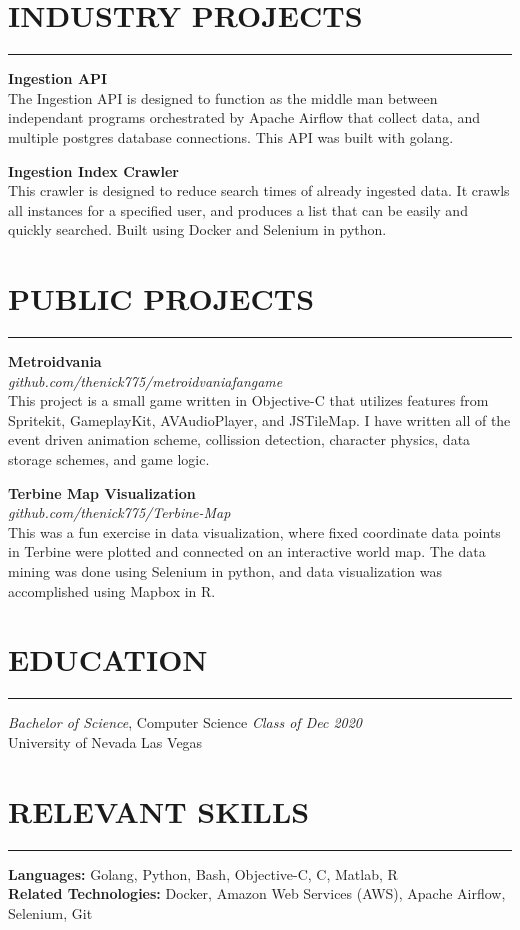 \documentclass{res}
\begin{document}
\begin{resume}
		\section{{INDUSTRY PROJECTS}}
    \noindent\rule[0.5ex]{\linewidth}{1pt}
		{\bf Ingestion API} \hfill \vspace{3pt} \\
			The Ingestion API is designed to function as the middle man between independant programs orchestrated by Apache Airflow that collect data, and multiple postgres database connections. This API was built with golang.

		{\bf Ingestion Index Crawler} \hfill \vspace{3pt}\\
			This crawler is designed to reduce search times of already ingested data. It crawls all instances for a specified user, and produces a list that can be easily and quickly searched. Built using Docker and Selenium in python.

		\section{{PUBLIC PROJECTS}}
    \noindent\rule[0.5ex]{\linewidth}{1pt}
		{\bf Metroidvania} \\
			\emph{github.com/thenick775/metroidvaniafangame} \hfill \vspace{3pt}\\
			This project is a small game written in Objective-C that utilizes features from Spritekit, GameplayKit, AVAudioPlayer, and JSTileMap. I have written all of the event driven animation scheme, collission detection, character physics, data storage schemes, and game logic.

		{\bf Terbine Map Visualization} \\
			\emph{github.com/thenick775/Terbine-Map} \hfill \vspace{3pt} \\
			This was a fun exercise in data visualization, where fixed coordinate data points in Terbine were plotted and connected on an interactive world map. The data mining was done using Selenium in python, and data visualization was accomplished using Mapbox in R.


		\section{{EDUCATION}}
    \noindent\rule[0.5ex]{\linewidth}{1pt}
		{\sl Bachelor of Science}, Computer Science \hfill \emph{Class of Dec 2020} \\
		University of Nevada Las Vegas


		\section{{RELEVANT SKILLS}}
    \noindent\rule[0.5ex]{\linewidth}{1pt}
			{\bf Languages:} Golang, Python, Bash, Objective-C, C, Matlab, R \\
			{\bf Related Technologies:} Docker, Amazon Web Services (AWS), Apache Airflow, Selenium, Git

	\end{resume}
\end{document}

